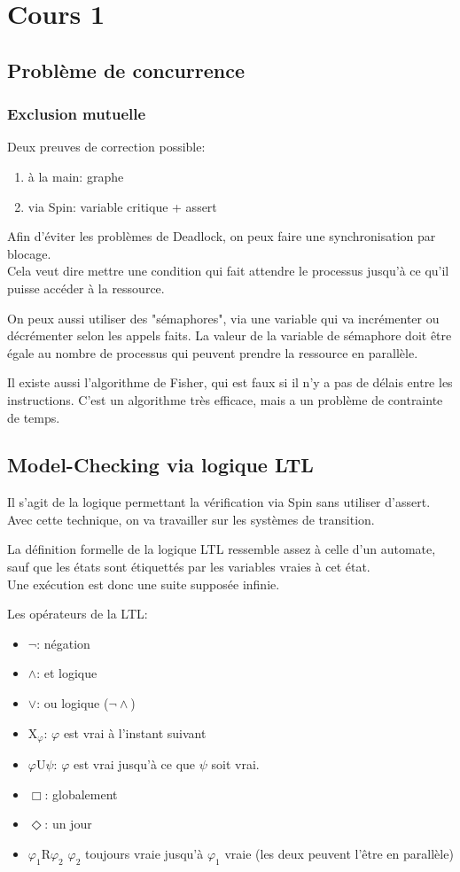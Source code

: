 \section{Cours 1}
\subsection{Problème de concurrence}
\subsubsection{Exclusion mutuelle}
Deux preuves de correction possible:
\begin{enumerate}
	\item à la main: graphe
	\item via Spin: variable critique + assert
\end{enumerate}

Afin d'éviter les problèmes de Deadlock, on peux
faire une synchronisation par blocage.\\
Cela veut dire mettre une condition qui fait
attendre le processus jusqu'à ce qu'il puisse
accéder à la ressource.

On peux aussi utiliser des "sémaphores", via une
variable qui va incrémenter ou décrémenter selon
les appels faits. La valeur de la variable de
sémaphore doit être égale au nombre de processus
qui peuvent prendre la ressource en parallèle.

Il existe aussi l'algorithme de Fisher, qui est faux
si il n'y a pas de délais entre les instructions.
C'est un algorithme très efficace, mais a un
problème de contrainte de temps.

\subsection{Model-Checking via logique LTL}
Il s'agit de la logique permettant la vérification
via Spin sans utiliser d'assert.\\
Avec cette technique, on va travailler sur les
systèmes de transition.

La définition formelle de la logique LTL ressemble
assez à celle d'un automate, sauf que les états
sont étiquettés par les variables vraies à cet
état.\\
Une exécution est donc une suite supposée infinie.

Les opérateurs de la LTL:
\begin{itemize}
	\item $\lnot$: négation
	\item $\wedge$: et logique
	\item $\vee$: ou logique ($\lnot\wedge$)
	\item X$_\varphi$: $\varphi$ est vrai à
	l'instant suivant
	\item $\varphi$U$\psi$: $\varphi$ est vrai
	jusqu'à ce que $\psi$ soit vrai.
	\item $\Box$: globalement
	\item $\Diamond$: un jour
	\item $\varphi_1$R$\varphi_2$ $\varphi_2$
	toujours vraie jusqu'à $\varphi_1$ vraie
	(les deux peuvent l'être en parallèle)
\end{itemize}

